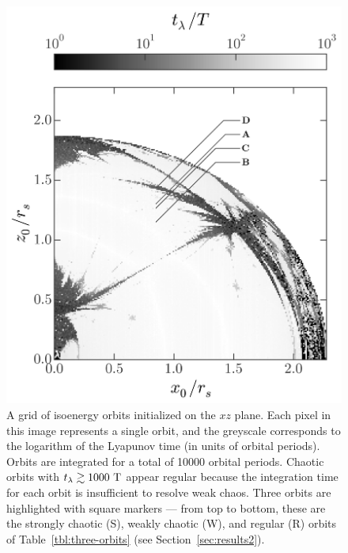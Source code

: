 \documentclass[letterpaper,12pt,preprint]{aastex}
\newcommand{\periods}{\ensuremath{{\rm T}}}
\begin{document}
\begin{figure}[p]
\begin{center}
\includegraphics[width=\textwidth, trim={0 1cm 0 0}]{figures/lyap_map.png}
\caption{ A grid of isoenergy orbits initialized on the $xz$ plane. Each pixel in this image represents a single orbit, and the greyscale corresponds to the logarithm of the Lyapunov time (in units of orbital periods). Orbits are integrated for a total of 10000 orbital periods. Chaotic orbits with $t_\lambda \gtrsim 1000~\periods$ appear regular because the integration time for each orbit is insufficient to resolve weak chaos. Three orbits are highlighted with square markers --- from top to bottom, these are the strongly chaotic (S), weakly chaotic (W), and regular (R) orbits of Table~\ref{tbl:three-orbits} (see Section~\ref{sec:results2}).} \label{fig:lyapmap} 
\end{center}
\end{figure}
\end{document}
